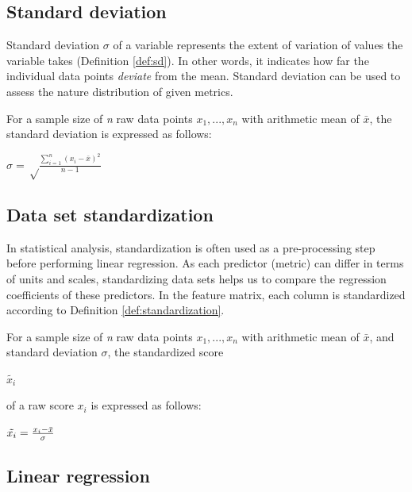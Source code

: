 \subsection*{Standard deviation}
Standard deviation $\sigma$ of a variable represents the extent of variation of values the variable takes (Definition \ref{def:sd}). In other words, it indicates how far the individual data points \textit{deviate} from the mean. Standard deviation can be used to assess the nature distribution of given metrics. 
\theoremstyle{definition}
\begin{definition}{For a sample size of \textit{n} raw data points \textit{$x_1,...,x_n$} with arithmetic mean of $\bar{x}$, the standard deviation is expressed as follows:  }
\begin{center}\Large
$\sigma = \sqrt\frac{\sum\limits_{i=1}^{n}(x_i - \bar{x})^2} {n - 1}$
\label{def:sd}
\end{center}
\end{definition}

\subsection*{Data set standardization}
In statistical analysis, standardization is often used as a pre-processing step before performing linear regression. As each predictor (metric) can differ in terms of units and scales, standardizing data sets helps us to compare the regression coefficients of these predictors. In the feature matrix, each column is standardized according to Definition \ref{def:standardization}.

\theoremstyle{definition}
\begin{definition}{For a sample size of \textit{n} raw data points \textit{$x_1,...,x_n$} with arithmetic mean of $\bar{x}$, and standard deviation $\sigma$, the standardized score \begin{large}
$\tilde{x_{i}}$
\end{large} of a raw score \textit{$x_{i}$} is expressed as follows: }
\begin{center}\Large
$\begin{tiny}
\tilde{x_{i}}
\end{tiny} = {x_{i}- \bar{x} \over \sigma}$
\label{def:standardization}
\end{center}
\end{definition}

\subsection*{Linear regression}

